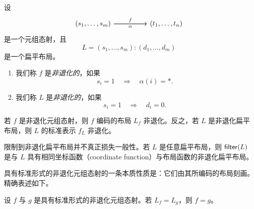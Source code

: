 \begin{definition}\label{definitionofflatnondegenerate}
    设
    \[
    \begin{tikzcd}
(s_1,\dots,s_m) \ar[rr,"f"] \ar[rr,swap,"\alpha"] & & (t_1,\dots,t_n)
    \end{tikzcd}
    \]
    是一个元组态射，且
    \[
    L = (s_1,\dots,s_m):(d_1,\dots,d_m)
    \]
    是一个扁平布局。
    \begin{enumerate}
    \item 我们称 $f$ 是{\it 非退化的}，如果
    \[
    s_i = 1 \quad \Rightarrow \quad \alpha(i) = *.
    \]
    \item 我们称 $L$ 是{\it 非退化的}，如果
    \[
    s_i = 1 \quad \Rightarrow \quad d_i = 0.
    \]
    \end{enumerate}
\end{definition}

\begin{observation}
    若 $f$ 是非退化元组态射，则 $f$ 编码的布局 $L_f$ 非退化。反之，若 $L$ 是非退化扁平布局，则 $L$ 的标准表示 $f_L$ 非退化。
\end{observation}

\begin{observation}
    限制到非退化扁平布局并不真正损失一般性。若 $L$ 是任意扁平布局，则 $\mathsf{filter}(L)$ 是与 $L$ 具有相同坐标函数（coordinate function）与布局函数的非退化扁平布局。
\end{observation}

具有标准形式的非退化元组态射的一条本质性质是：它们由其所编码的布局刻画。精确表述如下。

\begin{lemma}\label{nondegeneratestandardformtuplemorphisms}
设 $f$ 与 $g$ 是具有标准形式的非退化元组态射。若 $L_f = L_g$，则 $f = g$。
\end{lemma}

